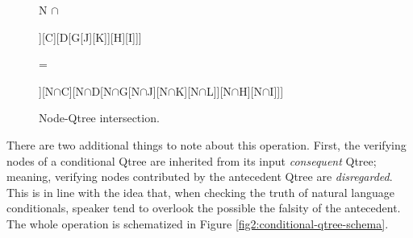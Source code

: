 \begin{figure}[H]
	\begin{center}
		\begin{minipage}[c]{.05\linewidth}
			\centering
			N $\cap$
		\end{minipage}
		\begin{minipage}[c]{.25\linewidth}
			\centering
			\begin{forest}
				[A[B[E][F]][C][D[G[J][K]][H][I]]]
			\end{forest}
		\end{minipage}
		\begin{minipage}[c]{.05\linewidth}
			\centering
			=
		\end{minipage}
		\begin{minipage}[c]{.35\linewidth}
			\centering
			\begin{forest}
				[N$\cap$A[N$\cap$B[N$\cap$E][N$\cap$F]][N$\cap$C][N$\cap$D[N$\cap$G[N$\cap$J][N$\cap$K][N$\cap$L]][N$\cap$H][N$\cap$I]]]
			\end{forest}
		\end{minipage}
	\end{center}
	\caption{Node-Qtree intersection.}\label{fig2:node-qtree-inter}
\end{figure}


There are two additional things to note about this operation.
First, the verifying nodes of a conditional Qtree are inherited from its input \textit{consequent} Qtree; meaning, verifying nodes contributed by the antecedent Qtree are \textit{disregarded}. This is in line with the idea that, when checking the truth of natural language conditionals, speaker tend to overlook the possible the falsity of the antecedent. The whole operation is schematized in Figure \ref{fig2:conditional-qtree-schema}.


